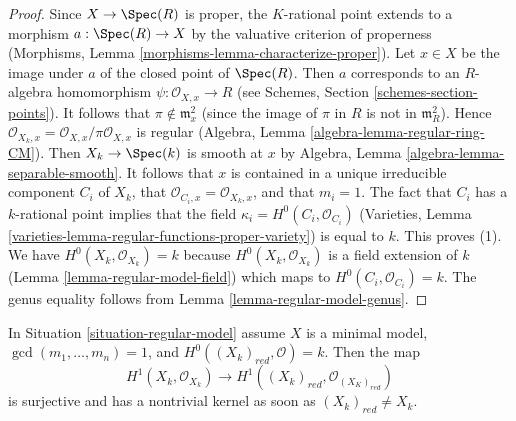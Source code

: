 \begin{proof}
Since $X \to \Spec(R)$ is proper, the $K$-rational point extends to
a morphism $a : \Spec(R) \to X$ by the valuative criterion of properness
(Morphisms, Lemma \ref{morphisms-lemma-characterize-proper}).
Let $x \in X$ be the image under $a$ of the closed point of $\Spec(R)$.
Then $a$ corresponds to an $R$-algebra homomorphism
$\psi : \mathcal{O}_{X, x} \to R$
(see Schemes, Section \ref{schemes-section-points}).
It follows that $\pi \not \in \mathfrak m_x^2$ (since the image
of $\pi$ in $R$ is not in $\mathfrak m_R^2$).
Hence $\mathcal{O}_{X_k, x} = \mathcal{O}_{X, x}/\pi \mathcal{O}_{X, x}$
is regular (Algebra, Lemma \ref{algebra-lemma-regular-ring-CM}).
Then $X_k \to \Spec(k)$ is smooth at $x$ by
Algebra, Lemma \ref{algebra-lemma-separable-smooth}.
It follows that $x$ is contained in a unique irreducible component
$C_i$ of $X_k$, that $\mathcal{O}_{C_i, x} = \mathcal{O}_{X_k, x}$,
and that $m_i = 1$. The fact that $C_i$ has a
$k$-rational point implies that the field
$\kappa_i = H^0(C_i, \mathcal{O}_{C_i})$
(Varieties, Lemma \ref{varieties-lemma-regular-functions-proper-variety})
is equal to $k$. This proves (1). We have
$H^0(X_k, \mathcal{O}_{X_k}) = k$
because $H^0(X_k, \mathcal{O}_{X_k})$ is a field
extension of $k$ (Lemma \ref{lemma-regular-model-field})
which maps to $H^0(C_i, \mathcal{O}_{C_i}) = k$.
The genus equality follows from Lemma \ref{lemma-regular-model-genus}.
\end{proof}

\begin{lemma}
\label{lemma-genus-reduction-smaller}
In Situation \ref{situation-regular-model} assume $X$ is a minimal model,
$\gcd(m_1, \ldots, m_n) = 1$, and $H^0((X_k)_{red}, \mathcal{O}) = k$. Then
the map
$$
H^1(X_k, \mathcal{O}_{X_k}) \to H^1((X_k)_{red}, \mathcal{O}_{(X_K)_{red}})
$$
is surjective and has a nontrivial kernel as soon as $(X_k)_{red} \not = X_k$.
\end{lemma}


